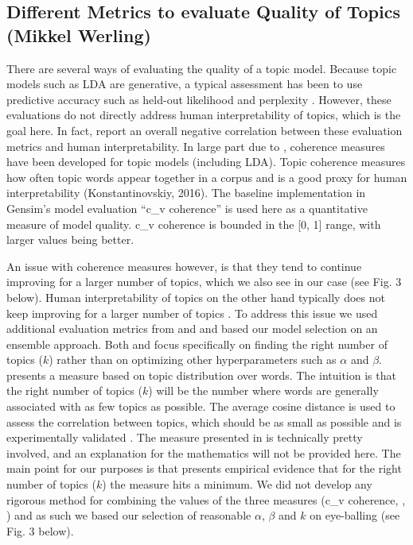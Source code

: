 \documentclass{article}
\begin{document}
    \subsection{Different Metrics to evaluate Quality of Topics (Mikkel Werling)}
There are several ways of evaluating the quality of a topic model. Because topic models such as LDA are generative, a typical assessment has been to use predictive accuracy such as held-out likelihood and perplexity \cite{chang2009reading}. However, these evaluations do not directly address human interpretability of topics, which is the goal here. In fact,  report an overall negative correlation between these evaluation metrics and human interpretability. In large part due to , coherence measures have been developed for topic models (including LDA). Topic coherence measures how often topic words appear together in a corpus and is a good proxy for human interpretability (Konstantinovskiy, 2016). The baseline implementation in Gensim’s model evaluation “c\_v coherence” is used here as a quantitative measure of model quality. c\_v coherence is bounded in the [0, 1] range, with larger values being better. 

An issue with coherence measures however, is that they tend to continue improving for a larger number of topics, which we also see in our case (see Fig. 3 below). Human interpretability of topics on the other hand typically does not keep improving for a larger number of topics \cite{chang2009reading}. To address this issue we used additional evaluation metrics from  and  and based our model selection on an ensemble approach. Both  and  focus specifically on finding the right number of topics ($k$) rather than on optimizing other hyperparameters such as $\alpha$ and $\beta$.  presents a measure based on topic distribution over words. The intuition is that the right number of topics ($k$) will be the number where words are generally associated with as few topics as possible. The average cosine distance is used to assess the correlation between topics, which should be as small as possible and is experimentally validated \cite{cao2009density}. The measure presented in  is technically pretty involved, and an explanation for the mathematics will not be provided here. The main point for our purposes is that  presents empirical evidence that for the right number of topics ($k$) the measure hits a minimum. We did not develop any rigorous method for combining the values of the three measures (c\_v coherence, \cite{cao2009density}, \cite{arun2010finding}) and as such we based our selection of reasonable $\alpha$, $\beta$ and $k$ on eye-balling (see Fig. 3 below). 
\end{document}
